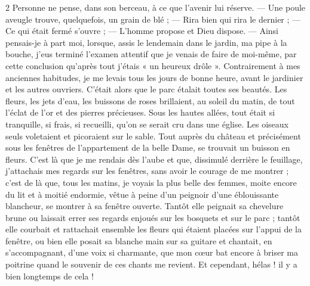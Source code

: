 \documentclass[a4paper,11pt]{article}
\begin{document}
\begin{paracol}{2}
         {Personne ne pense, dans son berceau, à ce que l’avenir lui réserve. --- Une poule aveugle trouve, quelquefois, un grain de blé ; --- Rira bien qui rira le dernier ; --- Ce qui était fermé s’ouvre ; --- L’homme propose et Dieu dispose. --- Ainsi pensais-je à part moi, lorsque, assis le lendemain dans le jardin, ma pipe à la bouche, j’eus terminé l’examen attentif que je venais de faire de moi-même, par cette conclusion qu’après tout j’étais « un heureux drôle ». Contrairement à mes anciennes habitudes, je me levais tous les jours de bonne heure, avant le jardinier et les autres ouvriers. C’était alors que le parc étalait toutes ses beautés. Les fleurs, les jets d’eau, les buissons de roses brillaient, au soleil du matin, de tout l’éclat de l’or et des pierres précieuses. Sous les hautes allées, tout était si tranquille, si frais, si recueilli, qu’on se serait cru dans une église. Les oiseaux seuls voletaient et picoraient sur le sable. Tout auprès du château et précisément sous les fenêtres de l’appartement de la belle Dame, se trouvait un buisson en fleurs. C’est là que je me rendais dès l’aube et que, dissimulé derrière le feuillage, j’attachais mes regards sur les fenêtres, sans avoir le courage de me montrer ; c’est de là que, tous les matins, je voyais la plus belle des femmes, moite encore du lit et à moitié endormie, vêtue à peine d’un peignoir d’une éblouissante blancheur, se montrer à sa fenêtre ouverte. Tantôt elle peignait sa chevelure brune ou laissait errer ses regards enjoués sur les bosquets et sur le parc ; tantôt elle courbait et rattachait ensemble les fleurs qui étaient placées sur l’appui de la fenêtre, ou bien elle posait sa blanche main sur sa guitare et chantait, en s’accompagnant, d’une voix si charmante, que mon cœur bat encore à briser ma poitrine quand le souvenir de ces chants me revient. Et cependant, hélas ! il y a bien longtemps de cela !}

\end{paracol}
\end{document}
